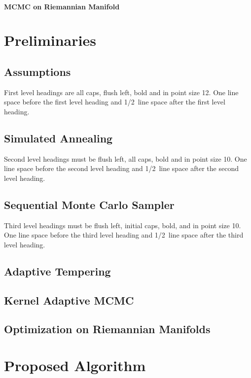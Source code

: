\documentclass{article}
\begin{document}
\paragraph{MCMC on Riemannian Manifold}




\section{Preliminaries}
\subsection{Assumptions}

First level headings are all caps, flush left, bold and in point size
12. One line space before the first level heading and 1/2~line space
after the first level heading.

\subsection{Simulated Annealing}

Second level headings must be flush left, all caps, bold and in point
size 10. One line space before the second level heading and 1/2~line
space after the second level heading.

\subsection{Sequential Monte Carlo Sampler}

Third level headings must be flush left, initial caps, bold, and in
point size 10.  One line space before the third level heading and
1/2~line space after the third level heading.

\subsection{Adaptive Tempering}


\subsection{Kernel Adaptive MCMC}


\subsection{Optimization on Riemannian Manifolds}



\section{Proposed Algorithm}
\end{document}
